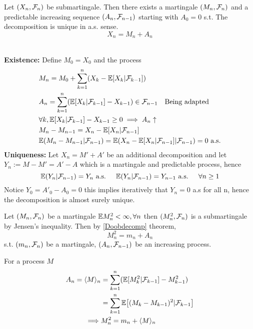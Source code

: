 \begin{thm}
\label{Doobdecomp}
Let $(X_n, \mathcal{F}_n)$ be submartingale. Then there exists a martingale $(M_n, \mathcal{F}_n)$ and a predictable increasing sequence $(A_n, \mathcal{F}_{n-1})$ starting with $A_0 = 0$ s.t. The decomposition is unique in a.s. sense.
\begin{equation*}
    X_n = M_n + A_n
\end{equation*}
\end{thm}
\pf \\
\textbf{Existence:} Define $M_0 = X_0$ and the process
\begin{align*}
    &M_n = M_0 + \sum\limits_{k=1}^n(X_k - \mathbb{E}[X_k|\mathcal{F}_{k-1}]) \\
    &A_n = \sum\limits_{k=1}^n(\mathbb{E}[X_k|\mathcal{F}_{k-1}]- X_{k-1}) \in \mathcal{F}_{n-1} \quad \text{Being adapted} \\
    &\forall k, \mathbb{E}[X_k|\mathcal{F}_{k-1}]- X_{k-1} \geq 0 \implies A_n\uparrow \\
    &M_{n} - M_{n-1} = X_n - \mathbb{E}[X_n|\mathcal{F}_{n-1}] \\
    &\mathbb{E}(M_{n} - M_{n-1}|\mathcal{F}_{n-1}) = \mathbb{E}(X_n - \mathbb{E}[X_n|\mathcal{F}_{n-1}]|\mathcal{F}_{n-1}) = 0 \text{ a.s.} \\
\end{align*}
\textbf{Uniqueness:}
Let $X_n = M'+A' $ be an additional decomposition and let $Y_n:= M-M' = A' - A$ which is a martingale and predictable process, hence \begin{equation*}
    \mathbb{E}(Y_n |\mathcal{F}_{n-1}) = Y_n \text{ a.s. } \quad \mathbb{E}(Y_n |\mathcal{F}_{n-1}) = Y_{n-1} \text{ a.s. } \quad \forall n\geq 1
\end{equation*}Notice $Y_0 = A'_0 - A_0 = 0$ this implies iteratively that $Y_n = 0$ a.s for all n, hence the decomposition is almost surely unique.

\newpage
Let $(M_n, \mathcal{F}_n)$ be a martingale $\mathbb{E} M_n^2 <\infty ,\forall n$ then $(M_n^2, \mathcal{F}_n)$ is a submartingale by Jensen's inequality. Then by \ref{Doobdecomp} theorem, 
\begin{equation*}
    M_n^2 = m_n + A_n
\end{equation*}s.t. $(m_n, \mathcal{F}_n)$ be a martingale, $(A_n, \mathcal{F}_{n-1})$ be an increasing process.

\begin{dfn} For a process $M$ \begin{align*}
    A_n = \langle{M} \rangle_n  &= \sum\limits_{k=1}^n(\mathbb{E}[M_k^2|\mathcal{F}_{k-1}]- M_{k-1}^2) \\
    &= \sum\limits_{k=1}^n \mathbb{E}\big[(M_k - M_{k-1})^2| \mathcal{F}_{k-1}\big] \\
    \implies& M_n^2 = m_n + \langle{M} \rangle_n
\end{align*}
\end{dfn}

